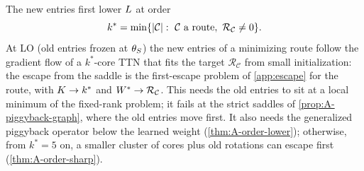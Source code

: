 \begin{proposition}\label{prop:A-escape-degree}
  \derived{} 
  The new entries first lower $L$ at order
  \begin{equation}\label{eq:A-kstar}
    k^*=\min\{\lvert\mathcal C\rvert:\ \mathcal C\text{ a route},\ \mathcal R_{\mathcal C}\ne0\}.
  \end{equation}
  At LO (old entries frozen at $\theta_S$) the new entries of a minimizing route follow the gradient flow
  of a $k^*$-core TTN that fits the target $\mathcal R_{\mathcal C}$ from small initialization: the escape from
  the saddle is the first-escape problem of \cref{app:escape} for the route, with $K\to k^*$ and
  $W^{*}\to\mathcal R_{\mathcal C}$. This needs the old entries to sit at a local minimum of the fixed-rank
  problem; it fails at the strict saddles of \cref{prop:A-piggyback-graph}, where the old entries move
  first. It also needs the generalized piggyback operator below the learned weight
  (\cref{thm:A-order-lower}); otherwise, from $k^*=5$ on, a smaller cluster of cores plus old rotations can
  escape first (\cref{thm:A-order-sharp}).
\end{proposition}

